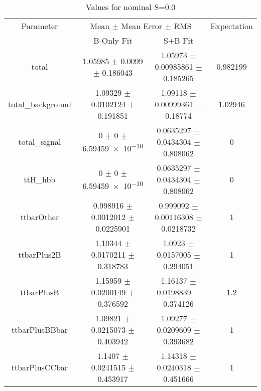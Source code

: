 \begin{table}
\centering
\caption{Values for nominal S=0.0}
\begin{tabular}{cccc}
\toprule
Parameter & \multicolumn{2}{c}{Mean $\pm$ Mean Error $\pm$ RMS} & Expectation\\
 & B-Only Fit & S+B Fit & \\
\midrule
total & \num{1.05985} $\pm$ \num{0.0099} $\pm$ \num{0.186043} & \num{1.05973} $\pm$ \num{0.00985861} $\pm$ \num{0.185265} & \num{0.982199}\\
total\_background & \num{1.09329} $\pm$ \num{0.0102124} $\pm$ \num{0.191851} & \num{1.09118} $\pm$ \num{0.00999361} $\pm$ \num{0.18774} & \num{1.02946}\\
total\_signal & \num{0} $\pm$ \num{0} $\pm$ \num{6.59459e-10} & \num{0.0635297} $\pm$ \num{0.0434304} $\pm$ \num{0.808062} & \num{0}\\
ttH\_hbb & \num{0} $\pm$ \num{0} $\pm$ \num{6.59459e-10} & \num{0.0635297} $\pm$ \num{0.0434304} $\pm$ \num{0.808062} & \num{0}\\
ttbarOther & \num{0.998916} $\pm$ \num{0.0012012} $\pm$ \num{0.0225901} & \num{0.999092} $\pm$ \num{0.00116308} $\pm$ \num{0.0218732} & \num{1}\\
ttbarPlus2B & \num{1.10344} $\pm$ \num{0.0170211} $\pm$ \num{0.318783} & \num{1.0923} $\pm$ \num{0.0157005} $\pm$ \num{0.294051} & \num{1}\\
ttbarPlusB & \num{1.15959} $\pm$ \num{0.0200149} $\pm$ \num{0.376592} & \num{1.16137} $\pm$ \num{0.0198839} $\pm$ \num{0.374126} & \num{1.2}\\
ttbarPlusBBbar & \num{1.09821} $\pm$ \num{0.0215073} $\pm$ \num{0.403942} & \num{1.09277} $\pm$ \num{0.0209609} $\pm$ \num{0.393682} & \num{1}\\
ttbarPlusCCbar & \num{1.1407} $\pm$ \num{0.0241515} $\pm$ \num{0.453917} & \num{1.14318} $\pm$ \num{0.0240318} $\pm$ \num{0.451666} & \num{1}\\
\bottomrule
\end{tabular}
\end{table}